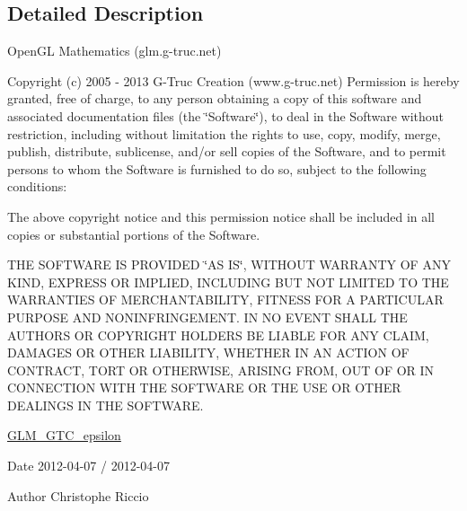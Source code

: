 \subsection{Detailed Description}
Open\+G\+L Mathematics (glm.\+g-\/truc.\+net)

Copyright (c) 2005 -\/ 2013 G-\/\+Truc Creation (www.\+g-\/truc.\+net) Permission is hereby granted, free of charge, to any person obtaining a copy of this software and associated documentation files (the \char`\"{}\+Software\char`\"{}), to deal in the Software without restriction, including without limitation the rights to use, copy, modify, merge, publish, distribute, sublicense, and/or sell copies of the Software, and to permit persons to whom the Software is furnished to do so, subject to the following conditions\+:

The above copyright notice and this permission notice shall be included in all copies or substantial portions of the Software.

T\+H\+E S\+O\+F\+T\+W\+A\+R\+E I\+S P\+R\+O\+V\+I\+D\+E\+D \char`\"{}\+A\+S I\+S\char`\"{}, W\+I\+T\+H\+O\+U\+T W\+A\+R\+R\+A\+N\+T\+Y O\+F A\+N\+Y K\+I\+N\+D, E\+X\+P\+R\+E\+S\+S O\+R I\+M\+P\+L\+I\+E\+D, I\+N\+C\+L\+U\+D\+I\+N\+G B\+U\+T N\+O\+T L\+I\+M\+I\+T\+E\+D T\+O T\+H\+E W\+A\+R\+R\+A\+N\+T\+I\+E\+S O\+F M\+E\+R\+C\+H\+A\+N\+T\+A\+B\+I\+L\+I\+T\+Y, F\+I\+T\+N\+E\+S\+S F\+O\+R A P\+A\+R\+T\+I\+C\+U\+L\+A\+R P\+U\+R\+P\+O\+S\+E A\+N\+D N\+O\+N\+I\+N\+F\+R\+I\+N\+G\+E\+M\+E\+N\+T. I\+N N\+O E\+V\+E\+N\+T S\+H\+A\+L\+L T\+H\+E A\+U\+T\+H\+O\+R\+S O\+R C\+O\+P\+Y\+R\+I\+G\+H\+T H\+O\+L\+D\+E\+R\+S B\+E L\+I\+A\+B\+L\+E F\+O\+R A\+N\+Y C\+L\+A\+I\+M, D\+A\+M\+A\+G\+E\+S O\+R O\+T\+H\+E\+R L\+I\+A\+B\+I\+L\+I\+T\+Y, W\+H\+E\+T\+H\+E\+R I\+N A\+N A\+C\+T\+I\+O\+N O\+F C\+O\+N\+T\+R\+A\+C\+T, T\+O\+R\+T O\+R O\+T\+H\+E\+R\+W\+I\+S\+E, A\+R\+I\+S\+I\+N\+G F\+R\+O\+M, O\+U\+T O\+F O\+R I\+N C\+O\+N\+N\+E\+C\+T\+I\+O\+N W\+I\+T\+H T\+H\+E S\+O\+F\+T\+W\+A\+R\+E O\+R T\+H\+E U\+S\+E O\+R O\+T\+H\+E\+R D\+E\+A\+L\+I\+N\+G\+S I\+N T\+H\+E S\+O\+F\+T\+W\+A\+R\+E.

\hyperlink{group__gtc__epsilon}{G\+L\+M\+\_\+\+G\+T\+C\+\_\+epsilon}

\begin{DoxyDate}{Date}
2012-\/04-\/07 / 2012-\/04-\/07 
\end{DoxyDate}
\begin{DoxyAuthor}{Author}
Christophe Riccio 
\end{DoxyAuthor}
